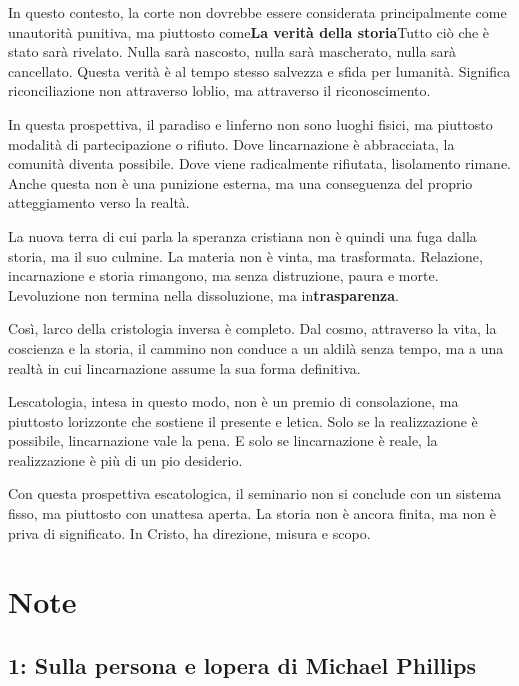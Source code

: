 \documentclass[
]{article}
\begin{document}
In questo contesto, la corte non dovrebbe essere considerata principalmente come un\textquotesingle autorità punitiva, ma piuttosto come\textbf{La verità della storia}Tutto ciò che è stato sarà rivelato. Nulla sarà nascosto, nulla sarà mascherato, nulla sarà cancellato. Questa verità è al tempo stesso salvezza e sfida per l\textquotesingle umanità. Significa riconciliazione non attraverso l\textquotesingle oblio, ma attraverso il riconoscimento.

In questa prospettiva, il paradiso e l\textquotesingle inferno non sono luoghi fisici, ma piuttosto modalità di partecipazione o rifiuto. Dove l\textquotesingle incarnazione è abbracciata, la comunità diventa possibile. Dove viene radicalmente rifiutata, l\textquotesingle isolamento rimane. Anche questa non è una punizione esterna, ma una conseguenza del proprio atteggiamento verso la realtà.

La nuova terra di cui parla la speranza cristiana non è quindi una fuga dalla storia, ma il suo culmine. La materia non è vinta, ma trasformata. Relazione, incarnazione e storia rimangono, ma senza distruzione, paura e morte. L\textquotesingle evoluzione non termina nella dissoluzione, ma in\textbf{trasparenza}.

Così, l\textquotesingle arco della cristologia inversa è completo. Dal cosmo, attraverso la vita, la coscienza e la storia, il cammino non conduce a un aldilà senza tempo, ma a una realtà in cui l\textquotesingle incarnazione assume la sua forma definitiva.

L\textquotesingle escatologia, intesa in questo modo, non è un premio di consolazione, ma piuttosto l\textquotesingle orizzonte che sostiene il presente e l\textquotesingle etica. Solo se la realizzazione è possibile, l\textquotesingle incarnazione vale la pena. E solo se l\textquotesingle incarnazione è reale, la realizzazione è più di un pio desiderio.

Con questa prospettiva escatologica, il seminario non si conclude con un sistema fisso, ma piuttosto con un\textquotesingle attesa aperta. La storia non è ancora finita, ma non è priva di significato. In Cristo, ha direzione, misura e scopo.

\section{Note}\label{note}

\subsection{1: Sulla persona e l\textquotesingle opera di Michael Phillips}\label{sulla-persona-e-lopera-di-michael-phillips}
\end{document}

